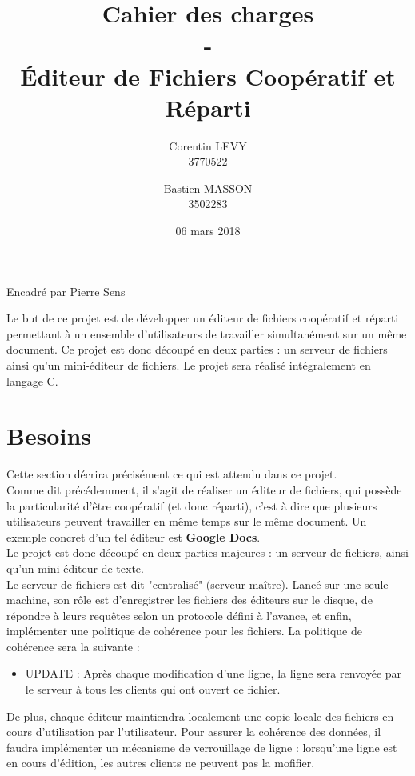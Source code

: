 \documentclass[14pt]{article}
\title{Cahier des charges\\-\\\'Editeur de Fichiers Coopératif et Réparti}
\author{Corentin LEVY\\3770522\\
		\and
		Bastien MASSON\\3502283}
\date{06 mars 2018}
\begin{document}
\begin{titlepage}

\maketitle
\begin{center}
Encadré par Pierre Sens
\end{center}

Le but de ce projet est de développer un éditeur de fichiers coopératif et réparti permettant à un ensemble d'utilisateurs de travailler simultanément sur un même document. Ce projet est donc découpé en deux parties : un serveur de fichiers ainsi qu'un mini-éditeur de fichiers. Le projet sera réalisé intégralement en langage C.

\end{titlepage}
\tableofcontents
\newpage
\section{Besoins}
Cette section décrira précisément ce qui est attendu dans ce projet.\\

Comme dit précédemment, il s'agit de réaliser un éditeur de fichiers, qui possède la particularité d'être coopératif (et donc réparti), c'est à dire que plusieurs utilisateurs peuvent travailler en même temps sur le même document. Un exemple concret d'un tel éditeur est \textbf{Google Docs}.\\

Le projet est donc découpé en deux parties majeures : un serveur de fichiers, ainsi qu'un mini-éditeur de texte.\\

Le serveur de fichiers est dit "centralisé" (serveur maître). Lancé sur une seule machine, son rôle est d'enregistrer les fichiers des éditeurs sur le disque, de répondre à leurs requêtes selon un protocole défini à l'avance, et enfin, implémenter une politique de cohérence pour les fichiers.
La politique de cohérence sera la suivante :\\
\begin{itemize}
\item UPDATE : Après chaque modification d'une ligne, la ligne sera renvoyée par le serveur à tous les clients qui ont ouvert ce fichier.\\
\end{itemize}

De plus, chaque éditeur maintiendra localement une copie locale des fichiers en cours d'utilisation par l'utilisateur. Pour assurer la cohérence des données, il faudra implémenter un mécanisme de verrouillage de ligne : lorsqu'une ligne est en cours d'édition, les autres clients ne peuvent pas la mofifier.\\
\end{document}
